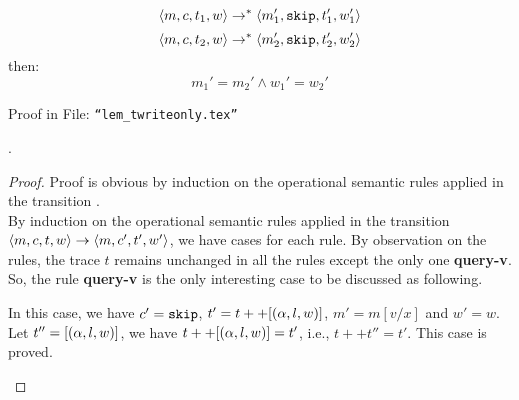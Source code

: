 {{{\begin{lem}
$$\langle m, c, t_1, w \rangle \to^{*} \langle m_1', \mathtt{skip}, t_1', w_1' \rangle$$
% 
$$\langle m, c, t_2, w \rangle \to^{*} \langle m_2', \mathtt{skip}, t_2', w_2' \rangle$$
%
then:
%
\[
  m_1' = m_2' \land w_1' = w_2'
\]
\end{lem}
%
\begin{subproof}
%
Proof in File: {\tt ``lem\_twriteonly.tex''}
% 
\end{subproof}
}
%
%
%
\begin{lem}
.
\\
\end{lem}
%
\begin{proof}
{
Proof is obvious by induction on the operational semantic rules applied in the transition 
.
\\
By induction on the operational semantic rules applied in the transition $\langle m, c, t, w \rangle 
\rightarrow
\langle m, c', t', w' \rangle$, 
we have cases for each rule.
By observation on the rules, 
the trace $t$ remains unchanged in all the rules except the only one \textbf{query-v}.
So, the rule \textbf{query-v} is the only interesting case to be discussed as following.
\begin{itemize}
\caseL{
\[
  \inferrule
  {
  \query(\qval) = v
  }
  {
  \config{m, [\assign{x}{\query(\qval)}]^l, t, w} \xrightarrow{}  
  \config{m, \eskip, t ++ [(\qval, l, w)], w}
  }
  ~\textbf{query-v}
\]
}
%
In this case, we have $c' = \mathtt{skip}$, 
$t' = t ++ [(\alpha, l, w)]$, $m' = m[v/x]$ and $w' = w$.
\\
Let $t'' = [(\alpha, l, w)]$, we have $t ++ [(\alpha, l, w)] = t'$,
i.e., $t ++ t'' = t'$. This case is proved.
\end{itemize}
}
\end{proof}
%
}
%
}
